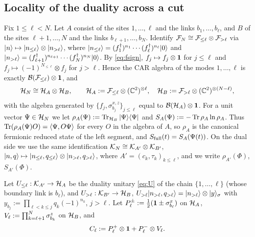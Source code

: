 \subsection{Locality of the duality across a cut}\label{sec:model:cut}

Fix $1\le\ell<N$.  Let $A$ consist of the sites $1,\dots,\ell$ and the links $b_1,\dots,b_\ell$, and
$B$ of the sites $\ell+1,\dots,N$ and the links $b_{\ell+1},\dots,b_N$.  Identify
$\mathcal{F}_N\cong\mathcal{F}_{\le\ell}\otimes\mathcal{F}_{>\ell}$ via $|n\rangle\mapsto|n_{\le\ell}\rangle\otimes|n_{>\ell}\rangle$, where
$|n_{\le\ell}\rangle=(f_1^\dagger)^{n_1}\cdots(f_\ell^\dagger)^{n_\ell}|0\rangle$ and
$|n_{>\ell}\rangle=(f_{\ell+1}^\dagger)^{n_{\ell+1}}\cdots(f_N^\dagger)^{n_N}|0\rangle$.  By
\eqref{eq:fsign}, $f_j\mapsto f_j\otimes\mathbf{1}$ for $j\le\ell$ and $f_j\mapsto(-1)^{N_{\le\ell}}\otimes f_j$
for $j>\ell$.  Hence the CAR algebra of the modes $1,\dots,\ell$ is exactly $\mathcal{B}(\mathcal{F}_{\le\ell})\otimes\mathbf{1}$,
and
\[
  \mathcal{H}_N\cong\mathcal{H}_A\otimes\mathcal{H}_B,\qquad\mathcal{H}_A:=\mathcal{F}_{\le\ell}\otimes(\mathbb{C}^2)^{\otimes\ell},\quad
  \mathcal{H}_B:=\mathcal{F}_{>\ell}\otimes(\mathbb{C}^2)^{\otimes(N-\ell)},
\]
with the algebra generated by $\{f_j,\sigma^{x,z}_{b_j}\}_{j\le\ell}$ equal to $\mathcal{B}(\mathcal{H}_A)\otimes\mathbf{1}$.
For a unit vector $\Psi\in\mathcal{H}_N$ we let $\rho_A(\Psi):=\operatorname{Tr}_{\mathcal{H}_B}|\Psi\rangle\langle \Psi|$ and
$S_A(\Psi):=-\operatorname{Tr}\rho_A\ln\rho_A$.  Thus $\operatorname{Tr}(\rho_A(\Psi)O)=\langle\Psi,O\Psi\rangle$ for every $O$ in the
algebra of $A$, so $\rho_A$ is the canonical fermionic reduced state of the left segment, and
$S_{\mathrm{full}}(t)=S_A(\Psi(t))$.  On the dual side we use the same identification
$\mathcal{K}_N\cong\mathcal{K}_{A'}\otimes\mathcal{K}_{B'}$, $|n,q\rangle\mapsto|n_{\le\ell},q_{\le\ell}\rangle\otimes|n_{>\ell},q_{>\ell}\rangle$, where
$A'=(c_k,\tau_k)_{k\le\ell}$, and we write $\rho_{A'}(\Phi)$, $S_{A'}(\Phi)$.

Let $U_{\le\ell}:\mathcal{K}_{A'}\to\mathcal{H}_A$ be the duality unitary \eqref{eq:U} of the chain $\{1,\dots,\ell\}$
(whose boundary link is $b_\ell$), and $U_{>\ell}:\mathcal{K}_{B'}\to\mathcal{H}_B$,
$U_{>\ell}|n_{>\ell},q_{>\ell}\rangle=|n_{>\ell}\rangle\otimes|y\rangle_\sigma$ with
$y_{b_j}:=\prod_{\ell<k\le j}q_k(-1)^{n_k}$, $j>\ell$.  Let $P^\pm_\ell:=\frac12(\mathbf{1}\pm\sigma^{x}_{b_{\ell}})$ on
$\mathcal{H}_A$, $V_\ell:=\prod_{k=\ell+1}^N\sigma^{z}_{b_{k}}$ on $\mathcal{H}_B$, and
\begin{equation}\label{eq:Cgate}
  C_\ell:=P^+_\ell\otimes\mathbf{1}+P^-_\ell\otimes V_\ell .
\end{equation}

